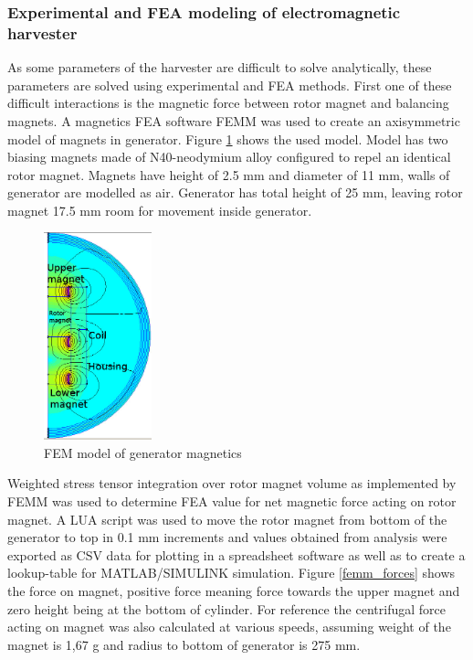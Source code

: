\subsubsection{Experimental and FEA modeling of electromagnetic harvester}
As some parameters of the harvester are difficult to solve analytically, these parameters are solved using experimental and FEA methods. First one of these difficult interactions is the magnetic force between rotor magnet and balancing magnets. A magnetics FEA software FEMM \cite{Meeker2013} was used to create an axisymmetric model of magnets in generator. Figure \ref{femm_tube} shows the used model. Model has two biasing magnets made of N40-neodymium alloy configured to repel an identical rotor magnet. Magnets have height of 2.5 mm and diameter of 11 mm, walls of generator are modelled as air. Generator has total height of 25 mm, leaving rotor magnet 17.5 mm room for movement inside generator.

\begin{figure}[htb]
\begin{center}
\includegraphics[height=6cm]{images/own_dwg/magnet_tube_model.jpg}
\end{center}
\caption{\label{femm_tube} FEM model of generator magnetics}
\end{figure}

Weighted stress tensor integration over rotor magnet volume as implemented by FEMM was used to determine FEA value for net magnetic force acting on rotor magnet. A LUA script was used to move the rotor magnet from bottom of the generator to top in 0.1 mm increments and values obtained from analysis were exported as CSV data for plotting in a spreadsheet software as well as to create a lookup-table for MATLAB/SIMULINK simulation. Figure \ref{femm_forces} shows the force on magnet, positive force meaning force towards the upper magnet and zero height being at the bottom of cylinder. For reference the centrifugal force acting on magnet was also calculated at various speeds, assuming weight of the magnet is 1,67 g and radius to bottom of generator is 275 mm.

